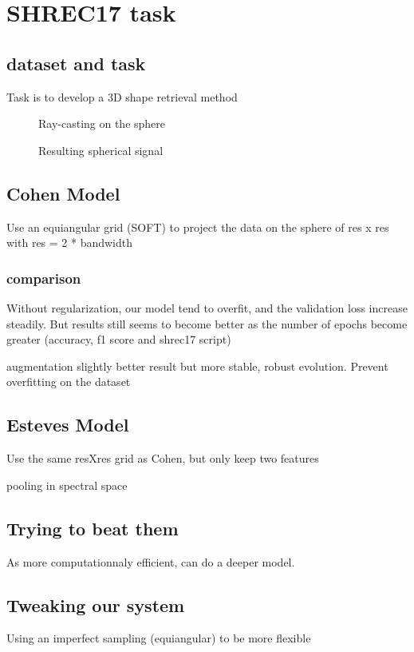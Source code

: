 \documentclass[11pt]{report}
\begin{document}
\section{SHREC17 task}
\subsection{dataset and task}
Task is to develop a 3D shape retrieval method
\begin{figure}[ht]
    \centering
    
    \caption{Ray-casting on the sphere}
    \label{fig:ray_cast}
\end{figure}
\begin{figure}[ht]
    \centering
    
    \caption{Resulting spherical signal}
    \label{fig:sphere_signal}
\end{figure}
\subsection{Cohen Model}
Use an equiangular grid (SOFT) to project the data on the sphere of res x res with res = 2 * bandwidth

\subsubsection{comparison}
Without regularization, our model tend to overfit, and the validation loss increase steadily. But results still seems to become better as the number of epochs become greater (accuracy, f1 score and shrec17 script)

augmentation slightly better result but more stable, robust evolution. Prevent overfitting on the dataset
\subsection{Esteves Model}
Use the same resXres grid as Cohen, but only keep two features

pooling in spectral space
\subsection{Trying to beat them}
As more computationnaly efficient, can do a deeper model.

\subsection{Tweaking our system}
Using an imperfect sampling (equiangular) to be more flexible
\end{document}
